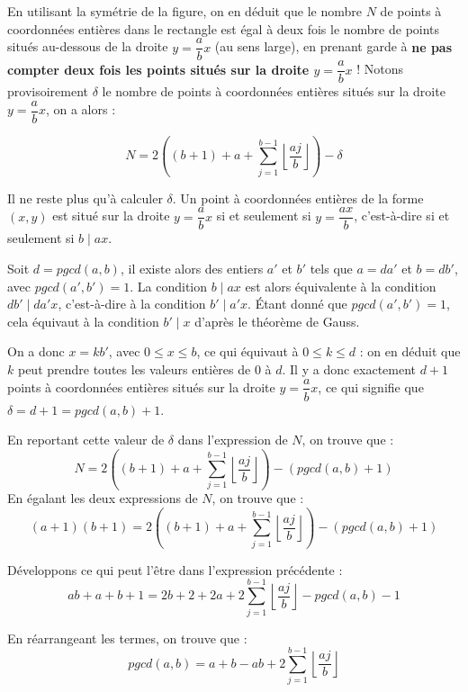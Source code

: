 \documentclass[11pt,a4paper]{article}
\begin{document}
En utilisant la symétrie de la figure, on en déduit que le nombre $N$ de points à coordonnées entières dans le rectangle est égal à deux fois le nombre de points situés au-dessous de la droite \(y = \dfrac{a}{b}x\) (au sens large),  en prenant garde à \textbf{ne pas compter deux fois les points situés sur la droite \(y = \dfrac{a}{b}x\)} ! Notons provisoirement $\delta$ le nombre de points à coordonnées entières situés sur la droite \(y = \dfrac{a}{b}x\), on a alors :

\[N = 2 \left( (b+1) + a + \sum _{j=1}^{b-1} \left\lfloor \frac{aj}{b} \right\rfloor \right) - \delta\]


Il ne reste plus qu'à calculer $\delta$. Un point à coordonnées entières de la forme \((x,y)\) est situé sur la droite \(y = \dfrac{a}{b}x\) si et seulement si \(y = \dfrac{ax}{b}\), c'est-à-dire si et seulement si \(b \mid ax\).

Soit $d=pgcd(a,b)$, il existe alors des entiers $a'$ et $b'$ tels que $a = da'$ et $b = db'$, avec $pgcd(a',b')=1$. La condition \(b \mid ax\) est alors équivalente à la condition \(db' \mid da'x\), c'est-à-dire à la condition \(b' \mid a'x\). Étant donné que $pgcd(a',b')=1$, cela équivaut à la condition \(b' \mid x\) d'après le théorème de Gauss.

On a donc $x=kb'$, avec $0 \leqslant x \leqslant b$, ce qui équivaut à $0 \leqslant k \leqslant d$ : on en déduit que $k$ peut prendre toutes les valeurs entières de $0$ à $d$. Il y a donc exactement $d+1$ points à coordonnées entières situés sur la droite \(y = \dfrac{a}{b}x\), ce qui signifie que $\delta = d + 1 = pgcd(a,b) + 1$.

En reportant cette valeur de $\delta$ dans l'expression de $N$, on trouve que :
\[N = 2 \left( (b+1) + a + \sum _{j=1}^{b-1} \left\lfloor \frac{aj}{b} \right\rfloor \right) - (pgcd(a,b) + 1)\]
En égalant les deux expressions de $N$, on trouve que :
\[(a+1)(b+1) = 2 \left( (b+1) + a + \sum _{j=1}^{b-1} \left\lfloor \frac{aj}{b} \right\rfloor \right) - (pgcd(a,b) + 1)\]

Développons ce qui peut l'être dans l'expression précédente :
\[ab + a + b + 1 = 2b + 2 + 2a + 2 \sum _{j=1}^{b-1} \left\lfloor \frac{aj}{b} \right\rfloor - pgcd(a,b) - 1\]

En réarrangeant les termes, on trouve que :
\[\boxed{pgcd(a,b) = a + b - ab + 2 \sum _{j=1}^{b-1} \left\lfloor \frac{aj}{b} \right\rfloor}\]
\end{document}
